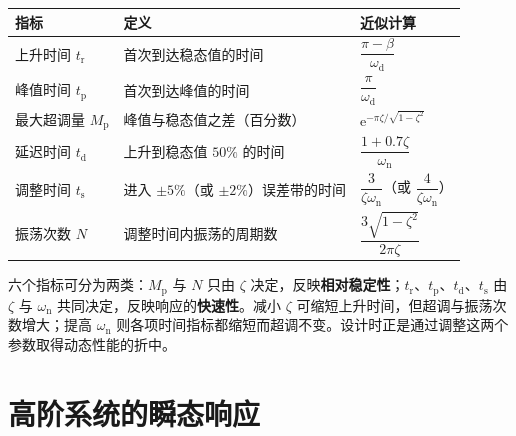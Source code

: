 \begin{keybox}[时域性能指标小结]
\centering
\renewcommand{\arraystretch}{1.6}
\begin{tabular}{lll}
\toprule
指标 & 定义 & 近似计算 \\
\midrule
上升时间 $t_{\mathrm{r}}$ & 首次到达稳态值的时间 & $\dfrac{\pi-\beta}{\omega_{\mathrm{d}}}$ \\
峰值时间 $t_{\mathrm{p}}$ & 首次到达峰值的时间 & $\dfrac{\pi}{\omega_{\mathrm{d}}}$ \\
最大超调量 $M_{\mathrm{p}}$ & 峰值与稳态值之差（百分数） & $\mathrm{e}^{-\pi\zeta/\sqrt{1-\zeta^{2}}}$ \\
延迟时间 $t_{\mathrm{d}}$ & 上升到稳态值 $50\%$ 的时间 & $\dfrac{1+0.7\zeta}{\omega_{\mathrm{n}}}$ \\
调整时间 $t_{\mathrm{s}}$ & 进入 $\pm5\%$（或 $\pm2\%$）误差带的时间 & $\dfrac{3}{\zeta\omega_{\mathrm{n}}}$（或 $\dfrac{4}{\zeta\omega_{\mathrm{n}}}$） \\
振荡次数 $N$ & 调整时间内振荡的周期数 & $\dfrac{3\sqrt{1-\zeta^{2}}}{2\pi\zeta}$ \\
\bottomrule
\end{tabular}
\end{keybox}

\begin{remark}
六个指标可分为两类：$M_{\mathrm{p}}$ 与 $N$ 只由 $\zeta$ 决定，反映\textbf{相对稳定性}；$t_{\mathrm{r}}$、$t_{\mathrm{p}}$、$t_{\mathrm{d}}$、$t_{\mathrm{s}}$ 由 $\zeta$ 与 $\omega_{\mathrm{n}}$ 共同决定，反映响应的\textbf{快速性}。减小 $\zeta$ 可缩短上升时间，但超调与振荡次数增大；提高 $\omega_{\mathrm{n}}$ 则各项时间指标都缩短而超调不变。设计时正是通过调整这两个参数取得动态性能的折中。
\end{remark}

\section{高阶系统的瞬态响应}
\label{sec:高阶系统的瞬态响应}

